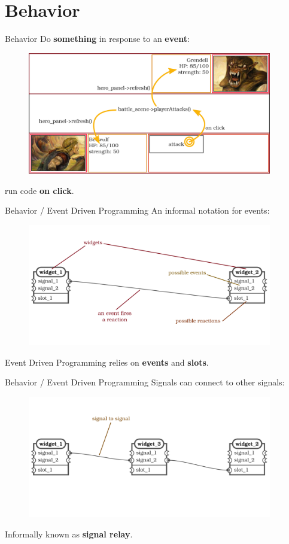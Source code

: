 \documentclass[11pt]{beamer}
\renewcommand{\emph}[1]{\textbf{#1}}
\begin{document}
\section{Behavior}
\begin{frame}{Behavior}
 Do \emph{something} in response to an \emph{event}:
 \begin{figure}
  \includegraphics[width=0.95\textwidth]{assets/figure-battle-scene-4}
 \end{figure}
 run code \emph{on click}.
\end{frame}

\begin{frame}{Behavior / Event Driven Programming}
 An informal notation for events:
 \begin{figure}
  \includegraphics[width=0.95\textwidth]{assets/event-driven-programming-1}
 \end{figure}
 Event Driven Programming relies on \emph{events} and \emph{slots}.
\end{frame}

\begin{frame}{Behavior / Event Driven Programming}
 Signals can connect to other signals:
 \begin{figure}
  \includegraphics[width=0.95\textwidth]{assets/event-driven-programming-2}
 \end{figure}
 Informally known as \emph{signal relay}.
\end{frame}
\end{document}
